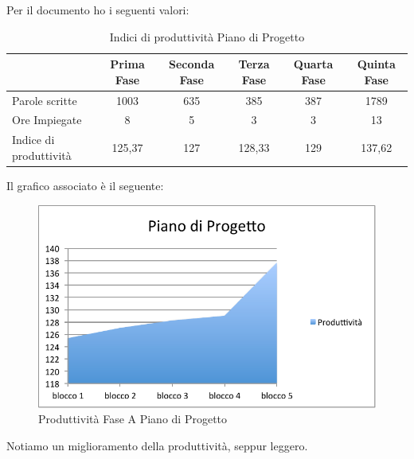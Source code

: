 						Per il documento  ho i seguenti valori:
						\begin{table}[H]\centering
							\begin{tabu}{| X[4] | c | c | c | c | c |}
								\hline
													&Prima Fase 	& Seconda Fase	& Terza Fase	& Quarta Fase 	& Quinta Fase  \\ \hline
												
								Parole scritte				& 1003		& 635 		& 385			& 387 		& 1789 	 \\ \hline
								Ore Impiegate				& 8			& 5 			& 3				& 3	 		& 13	 	  \\ \hline\hline
							
								Indice di produttività 			 & 125,37		& 127 		& 128,33			& 129 		& 137,62 	  \\ \hline
							\end{tabu}
							\caption{Indici di produttività Piano di Progetto}
						\end{table}
						Il grafico associato è il seguente:
						\begin{figure}[H]\centering
							\includegraphics[width=12cm]{PianoDiQualifica/Pics/ProduttivitaPdPFaseA.pdf}
							\caption{Produttività Fase A Piano di Progetto}
						\end{figure}
						Notiamo un miglioramento della produttività, seppur leggero.\\
					
